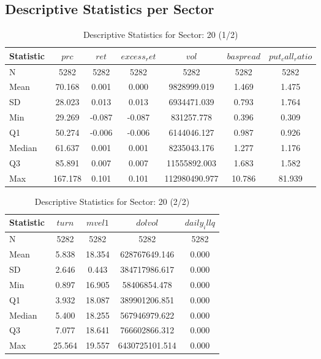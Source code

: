 \subsection{Descriptive Statistics per Sector} \label{sec:descriptive_statistics}
\begin{table}[H]
    \centering

    
    \caption{Descriptive Statistics for Sector: 20 (1/2)}
    \label{tab:sec20_a}
    
    \begin{tabular}{lcccccc}
    \toprule
    Statistic & $prc$ & $ret$ & $excess_ret$ & $vol$ & $baspread$ & $put_call_ratio$ \\\midrule
    N & 5282 & 5282 & 5282 & 5282 & 5282 & 5282 \\
    Mean & 70.168 & 0.001 & 0.000 & 9828999.019 & 1.469 & 1.475 \\
    SD & 28.023 & 0.013 & 0.013 & 6934471.039 & 0.793 & 1.764 \\
    Min & 29.269 & -0.087 & -0.087 & 831257.778 & 0.396 & 0.309 \\
    Q1 & 50.274 & -0.006 & -0.006 & 6144046.127 & 0.987 & 0.926 \\
    Median & 61.637 & 0.001 & 0.001 & 8235043.176 & 1.277 & 1.176 \\
    Q3 & 85.891 & 0.007 & 0.007 & 11555892.003 & 1.683 & 1.582 \\
    Max & 167.178 & 0.101 & 0.101 & 112980490.977 & 10.786 & 81.939 \\
    \bottomrule
    \end{tabular}

    \end{table}
    
    \begin{table}[H]
    \centering

    
    \caption{Descriptive Statistics for Sector: 20 (2/2)}
    \label{tab:sec20_b}
    
    \begin{tabular}{lcccc}
    \toprule
    Statistic & $turn$ & $mvel1$ & $dolvol$ & $daily_illq$ \\\midrule
    N & 5282 & 5282 & 5282 & 5282 \\
    Mean & 5.838 & 18.354 & 628767649.146 & 0.000 \\
    SD & 2.646 & 0.443 & 384717986.617 & 0.000 \\
    Min & 0.897 & 16.905 & 58406854.478 & 0.000 \\
    Q1 & 3.932 & 18.087 & 389901206.851 & 0.000 \\
    Median & 5.400 & 18.255 & 567946979.622 & 0.000 \\
    Q3 & 7.077 & 18.641 & 766602866.312 & 0.000 \\
    Max & 25.564 & 19.557 & 6430725101.514 & 0.000 \\
    \bottomrule
    \end{tabular}

    \end{table}
    
